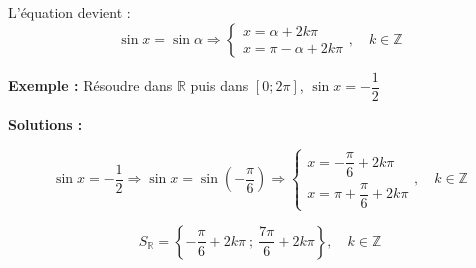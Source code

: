 \documentclass[a4paper,12pt]{article}
\begin{document}
L'équation devient :
\[
\sin x = \sin \alpha \Rightarrow 
\begin{cases}
x = \alpha + 2k\pi \\
x = \pi - \alpha + 2k\pi
\end{cases},\quad k \in \mathbb{Z}
\]

\noindent
\textbf{Exemple :} Résoudre dans \( \mathbb{R} \) puis dans \( [0 ; 2\pi] \), \( \sin x = -\dfrac{1}{2} \)

\textbf{Solutions :}

\[
\sin x = -\frac{1}{2} \Rightarrow \sin x = \sin\left(-\frac{\pi}{6} \right)
\Rightarrow
\begin{cases}
x = -\dfrac{\pi}{6} + 2k\pi \\
x = \pi + \dfrac{\pi}{6} + 2k\pi
\end{cases},\quad k \in \mathbb{Z}
\]

\[
S_{\mathbb{R}} = \left\{ -\frac{\pi}{6} + 2k\pi \ ;\ \frac{7\pi}{6} + 2k\pi \right\},\quad k \in \mathbb{Z}
\]
\end{document}
